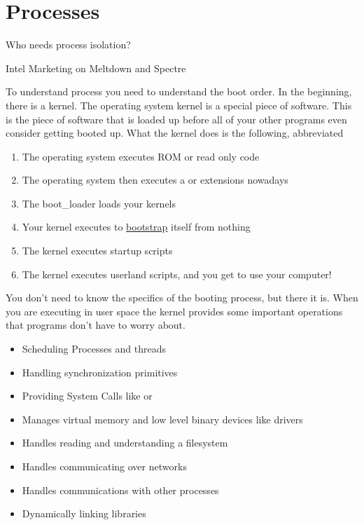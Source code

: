 \chapter{Processes}

\epigraph{Who needs process isolation?}{Intel Marketing on Meltdown and Spectre}

To understand process you need to understand the boot order.
In the beginning, there is a kernel.
The operating system kernel is a special piece of software.
This is the piece of software that is loaded up before all of your other programs even consider getting booted up.
What the kernel does is the following, abbreviated

\begin{enumerate}
  \def\labelenumi{\arabic{enumi}.}
  \tightlist
\item
  The operating system executes ROM or read only code
\item
  The operating system then executes a  or  extensions nowadays
\item
  The boot\_loader loads your kernels
\item
  Your kernel executes  to \href{https://en.wikipedia.org/wiki/Bootstrapping}{bootstrap} itself from nothing
\item
  The kernel executes startup scripts
\item
  The kernel executes userland scripts, and you get to use your computer!
\end{enumerate}

You don't need to know the specifics of the booting process, but there it is.
When you are executing in user space the kernel provides some important operations that programs don't have to worry about.

\begin{itemize}
\item Scheduling Processes and threads
\item Handling synchronization primitives
\item Providing System Calls like  or 
\item Manages virtual memory and low level binary devices like  drivers
\item Handles reading and understanding a filesystem
\item Handles communicating over networks
\item Handles communications with other processes
\item Dynamically linking libraries
\end{itemize}

